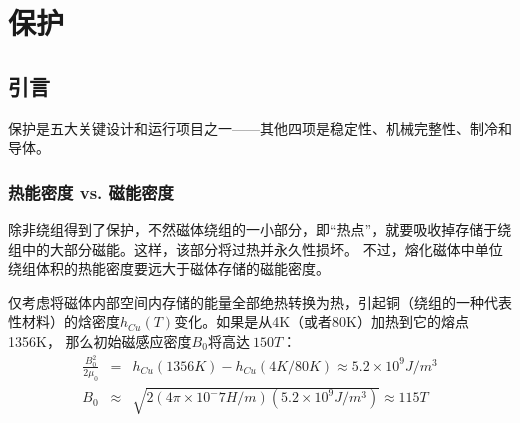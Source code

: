 \chapter{保护}
\section{引言}
保护是五大关键设计和运行项目之一——其他四项是稳定性、机械完整性、制冷和导体。
\subsection{热能密度 vs. 磁能密度}
除非绕组得到了保护，不然磁体绕组的一小部分，即“热点”，就要吸收掉存储于绕组中的大部分磁能。这样，该部分将过热并永久性损坏。
不过，熔化磁体中单位绕组体积的热能密度要远大于磁体存储的磁能密度。

仅考虑将磁体内部空间内存储的能量全部绝热转换为热，引起铜（绕组的一种代表性材料）的焓密度$h_{Cu}(T)$变化。如果是从4K（或者80K）加热到它的熔点1356K，
那么初始磁感应密度$B_0$将高达$~150 T$：
\begin{eqnarray}\label{eqn: 8.1}
  \frac{B_0^2}{2\mu_0}&=& h_{Cu}(1356K)-h_{Cu}(4K/80K)\approx 5.2\times 10^9 J/m^3 \nonumber\\
  B_0 &\approx
   &\sqrt{2(4\pi \times 10^-7 H/m)(5.2\times 10^9 J/m^3)}\approx 115 T
\end{eqnarray}



